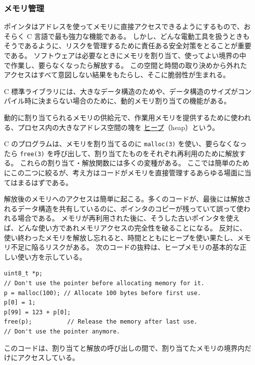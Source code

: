 \documentclass[uplatex]{jsarticle}
\def\label#1{}%
\begin{document}
\subsubsection{メモリ管理}

ポインタはアドレスを使ってメモリに直接アクセスできるようにするもので、おそらく C 言語で最も強力な機能である。
しかし、どんな電動工具を扱うときもそうであるように、リスクを管理するために責任ある安全対策をとることが重要である。
ソフトウェアは必要なときにメモリを割り当て、使ってよい境界の中で作業し、要らなくなったら解放する。
この空間と時間の取り決めから外れたアクセスはすべて意図しない結果をもたらし、そこに脆弱性が生まれる。

C 標準ライブラリには、大きなデータ構造のためや、データ構造のサイズがコンパイル時に決まらない場合のために、動的メモリ割り当ての機能がある。

\begin{dfn}[ヒープ]\label{dfn:ch9-heap}
動的に割り当てられるメモリの供給元で、作業用メモリを提供するために使われる、プロセス内の大きなアドレス空間の塊を \underline{ヒープ}（heap）という。
\end{dfn}

C のプログラムは、メモリを割り当てるのに \texttt{malloc(3)} を使い、要らなくなったら \texttt{free(3)} を呼び出して、割り当てたものをそれぞれ再利用のために解放する。
これらの割り当て・解放関数には多くの変種がある。
ここでは簡単のためにこの二つに絞るが、考え方はコードがメモリを直接管理するあらゆる場面に当てはまるはずである。

解放後のメモリへのアクセスは簡単に起こる。多くのコードが、最後には解放されるデータ構造を共有しているのに、ポインタのコピーが残っていて誤って使われる場合である。
メモリが再利用された後に、そうした古いポインタを使えば、どんな使い方であれメモリアクセスの完全性を破ることになる。
反対に、使い終わったメモリを解放し忘れると、時間とともにヒープを使い果たし、メモリ不足に陥るリスクがある。
次のコードの抜粋は、ヒープメモリの基本的な正しい使い方を示している。

\begin{verbatim}
uint8_t *p;
// Don't use the pointer before allocating memory for it.
p = malloc(100); // Allocate 100 bytes before first use.
p[0] = 1;
p[99] = 123 + p[0];
free(p);          // Release the memory after last use.
// Don't use the pointer anymore.
\end{verbatim}

このコードは、割り当てと解放の呼び出しの間で、割り当てたメモリの境界内だけにアクセスしている。
\end{document}
